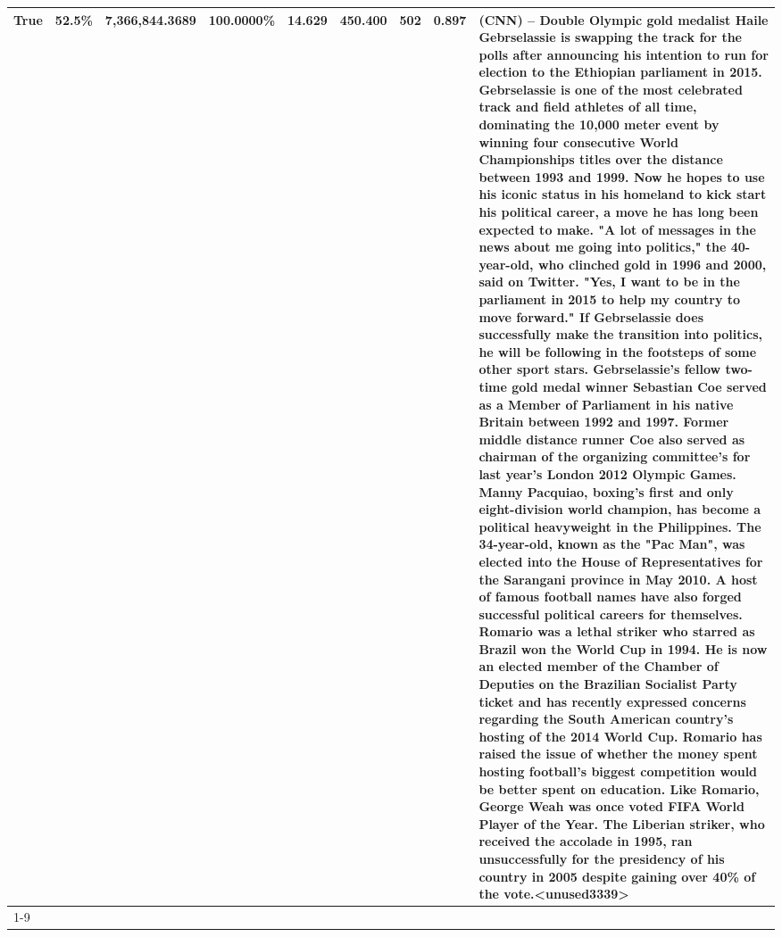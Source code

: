 \begin{table}[H]
{\begin{tabular}{lllrlllll}
True & 52.5\% & 7,366,844.3689 & \bfseries \color{red} 100.0000\% & 14.629 & 450.400 & 502 & 0.897 & (CNN) -- Double Olympic gold medalist Haile Gebrselassie is swapping the track for the polls after announcing his intention to run for election to the Ethiopian parliament in 2015. Gebrselassie is one of the most celebrated track and field athletes of all time, dominating the 10,000 meter event by winning four consecutive World Championships titles over the distance between 1993 and 1999. Now he hopes to use his iconic status in his homeland to kick start his political career, a move he has long been expected to make. "A lot of messages in the news about me going into politics," the 40-year-old, who clinched gold in 1996 and 2000, said on Twitter. "Yes, I want to be in the parliament in 2015 to help my country to move forward." If Gebrselassie does successfully make the transition into politics, he will be following in the footsteps of some other sport stars. Gebrselassie's fellow two-time gold medal winner Sebastian Coe served as a Member of Parliament in his native Britain between 1992 and 1997. Former middle distance runner Coe also served as chairman of the organizing committee's for last year's London 2012 Olympic Games. Manny Pacquiao, boxing's first and only eight-division world champion, has become a political heavyweight in the Philippines. The 34-year-old, known as the "Pac Man", was elected into the House of Representatives for the Sarangani province in May 2010. A host of famous football names have also forged successful political careers for themselves. Romario was a lethal striker who starred as Brazil won the World Cup in 1994. He is now an elected member of the Chamber of Deputies on the Brazilian Socialist Party ticket and has recently expressed concerns regarding the South American country's hosting of the 2014 World Cup. Romario has raised the issue of whether the money spent hosting football's biggest competition would be better spent on education. Like Romario, George Weah was once voted FIFA World Player of the Year. The Liberian striker, who received the accolade in 1995, ran unsuccessfully for the presidency of his country in 2005 despite gaining over 40\% of the vote.<unused3339> \\
\cline{1-9}

\end{tabular}}
\end{table}
